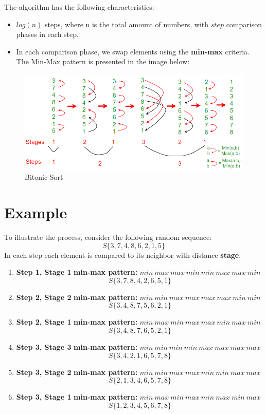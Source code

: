 \documentclass[12pt]{report}
\begin{document}
The algorithm has the following characteristics:
\begin{itemize}
    \item $log(n)$ steps, where n is the total amount of numbers, with $step$ comparison phases in each step.
    \item In each comparison phase, we swap elements using the \textbf{min-max} criteria. The Min-Max pattern is presented in the image below:
\end{itemize}

\begin{figure}
    \centering
    \includegraphics[width=0.9\linewidth]{assets/bitonic.png}
    \caption{Bitonic Sort}
    \label{fig:enter-label}
\end{figure}
\section{Example}

To illustrate the process, consider the following random sequence:
\[S\{ 3,7,4,8,6,2,1,5 \}\]
In each step each element is compared to its neighbor with distance \textbf{stage}.

\begin{enumerate}
    \item \textbf{Step 1, Stage 1}
    \textbf{min-max pattern:} $min\:max\:max\:min\:min\:max\:max\:min$
    \[
        S\{3,7,8,4,2,6,5,1\}
    \] 
    \item \textbf{Step 2, Stage 2}
    \textbf{min-max pattern:} $min\:min\:max\:max\:max\:max\:min\:min$
    \[
        S\{3,4,8,7,5,6,2,1\}
    \]
    \item \textbf{Step 2, Stage 1}
    \textbf{min-max pattern:} $min\:max\:min\:max\:max\:min\:max\:min$
    \[
        S\{3,4,8,7,6,5,2,1\}
    \]
    \item \textbf{Step 3, Stage 3}
    \textbf{min-max pattern:} $min\:min\:min\:min\:max\:max\:max\:max$
    \[
        S\{3,4,2,1,6,5,7,8\}
    \]
    \item \textbf{Step 3, Stage 2}
    \textbf{min-max pattern:} $min\:min\:max\:max\:min\:min\:max\:max$
    \[
        S\{2,1,3,4,6,5,7,8\}
    \]
    \item \textbf{Step 3, Stage 1}
    \textbf{min-max pattern:} $min\:max\:min\:max\:min\:max\:min\:max$
    \[
        S\{1, 2, 3, 4, 5, 6, 7, 8\}
    \]
\end{enumerate}
\end{document}
